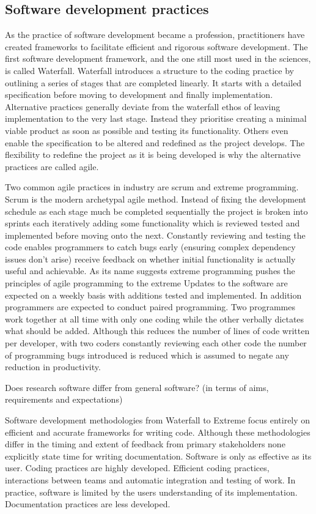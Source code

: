 \documentclass{SBCbookchapter}
\begin{document}
\subsection{Software development practices}

As the practice of software development became a profession, practitioners have created frameworks to facilitate efficient and rigorous software development.
The first software development framework, and the one still most used in the sciences, is called Waterfall.
Waterfall introduces a structure to the coding practice by outlining a series of stages that are completed linearly.
It starts with a detailed specification before moving to development and finally implementation.
Alternative practices generally deviate from the waterfall ethos of leaving implementation to the very last stage.
Instead they prioritise creating a minimal viable product as soon as possible and testing its functionality.
Others even enable the specification to be altered and redefined as the project develops.
The flexibility to redefine the project as it is being developed is why the alternative practices are called agile. 

Two common agile practices in industry are scrum and extreme programming.
Scrum is the modern archetypal agile method.
Instead of fixing the development schedule as each stage much be completed sequentially the project is broken into sprints each iteratively adding some functionality which is reviewed tested and implemented before moving onto the next.
Constantly reviewing and testing the code enables programmers to catch bugs early (ensuring complex dependency issues don't arise) receive feedback on whether initial functionality is actually useful and achievable.
As its name suggests extreme programming pushes the principles of agile programming to the extreme
Updates to the software are expected on a weekly basis with additions tested and implemented. 
In addition programmers are expected to conduct paired programming. 
Two programmes work together at all time with only one coding while the other verbally dictates what should be added. 
Although this reduces the number of lines of code written per developer, with two coders constantly reviewing each other code the number of programming bugs introduced is reduced which is assumed to negate any reduction in productivity.

Does research software differ from general software? (in terms of aims, requirements and expectations)

Software development methodologies from Waterfall to Extreme focus entirely on efficient and accurate frameworks for writing code. 
Although these methodologies differ in the timing and extent of feedback from primary stakeholders none explicitly state time for writing documentation. 
Software is only as effective as its user.
Coding practices are highly developed. Efficient coding practices, interactions between teams and automatic integration and testing of work. In practice, software is limited by the users understanding of its implementation.
Documentation practices are less developed.
\end{document}
